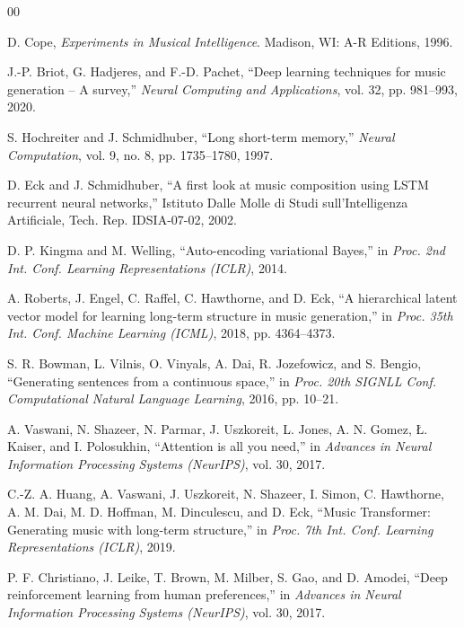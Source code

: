 \documentclass[conference]{IEEEtran}
\begin{document}

\begin{thebibliography}{00}

D. Cope, \textit{Experiments in Musical Intelligence}. Madison, WI: A-R Editions, 1996.

J.-P. Briot, G. Hadjeres, and F.-D. Pachet, ``Deep learning techniques for music generation -- A survey,'' \textit{Neural Computing and Applications}, vol. 32, pp. 981--993, 2020.

S. Hochreiter and J. Schmidhuber, ``Long short-term memory,'' \textit{Neural Computation}, vol. 9, no. 8, pp. 1735--1780, 1997.

D. Eck and J. Schmidhuber, ``A first look at music composition using LSTM recurrent neural networks,'' Istituto Dalle Molle di Studi sull'Intelligenza Artificiale, Tech. Rep. IDSIA-07-02, 2002.

D. P. Kingma and M. Welling, ``Auto-encoding variational Bayes,'' in \textit{Proc. 2nd Int. Conf. Learning Representations (ICLR)}, 2014.

A. Roberts, J. Engel, C. Raffel, C. Hawthorne, and D. Eck, ``A hierarchical latent vector model for learning long-term structure in music generation,'' in \textit{Proc. 35th Int. Conf. Machine Learning (ICML)}, 2018, pp. 4364--4373.

S. R. Bowman, L. Vilnis, O. Vinyals, A. Dai, R. Jozefowicz, and S. Bengio, ``Generating sentences from a continuous space,'' in \textit{Proc. 20th SIGNLL Conf. Computational Natural Language Learning}, 2016, pp. 10--21.

A. Vaswani, N. Shazeer, N. Parmar, J. Uszkoreit, L. Jones, A. N. Gomez, \L. Kaiser, and I. Polosukhin, ``Attention is all you need,'' in \textit{Advances in Neural Information Processing Systems (NeurIPS)}, vol. 30, 2017.

C.-Z. A. Huang, A. Vaswani, J. Uszkoreit, N. Shazeer, I. Simon, C. Hawthorne, A. M. Dai, M. D. Hoffman, M. Dinculescu, and D. Eck, ``Music Transformer: Generating music with long-term structure,'' in \textit{Proc. 7th Int. Conf. Learning Representations (ICLR)}, 2019.

P. F. Christiano, J. Leike, T. Brown, M. Milber, S. Gao, and D. Amodei, ``Deep reinforcement learning from human preferences,'' in \textit{Advances in Neural Information Processing Systems (NeurIPS)}, vol. 30, 2017.


\end{thebibliography}
\end{document}
